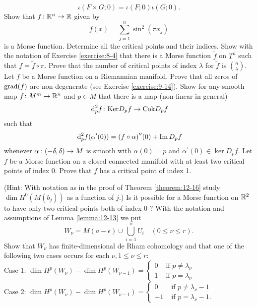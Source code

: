 \begin{enumerate}[\theexercise.1]
    \[
      \iota ( {F \times  G;0})  = \iota ( {F;0}) \iota ( {G;0}).
    \]
  \newchap[12]
  \NewItem Show that $f\colon {\ensuremath{\mathbb{R}}}^{n} \rightarrow  \mathbb{R}$ given by
    \[
      f( x)  = \sum_{{j = 1}}^{n}{\sin }^{2}( {\pi {x}_{j}})
    \]
    is a Morse function. Determine all the critical points and their indices. Show with the notation of Exercise \ref{exercise:8-4} that there is a Morse function $\tilde{f}$ on ${T}^{n}$ such that $f = \tilde{f} \circ  \pi$. Prove that the number of critical points of index $\lambda$ for $\tilde{f}$ is $\binom{n}{\lambda}$.
  \NewItem Let $f$ be a Morse function on a Riemannian manifold. Prove that all zeros of $\mathrm{grad}( f)$ are non-degenerate (see Exercise \ref{exercise:9-14}).
  \NewItem Show for any smooth map $f\colon {M}^{m} \rightarrow  {\ensuremath{\mathbb{R}}}^{n}$ and $p \in  M$ that there is a map (non-linear in general)
    \[
      {\dd}_{p}^{2}f\colon {\ker}{D}_{p}f \ra  {\cok}{D}_{p}f
    \]
    such that
    \[
      {\dd}_{p}^{2}f( {{\alpha }^{\prime }( 0) })  = {( f \circ  \alpha ) }^{\prime \prime }( 0)  + \im{D}_{p}f
    \]
    whenever $\alpha  : ( {-\delta,\delta })  \rightarrow  M$ is smooth with $\alpha ( 0)  = p$ and ${\alpha }^{\prime }( 0)  \in  {\ker}{D}_{p}f$.
  \NewItem Let $f$ be a Morse function on a closed connected manifold with at least two critical points of index 0. Prove that $f$ has a critical point of index 1.
    \par(Hint: With notation as in the proof of Theorem \ref{theorem:12-16} study $\dim {H}^{0}( {M( {b}_{j}) })$ as a function of $j$.)
  \NewItem Is it possible for a Morse function on ${\mathbb{R}}^{2}$ to have only two critical points both of index 0 ?
    \NewItem With the notation and assumptions of Lemma \ref{lemma:12-13} we put
    \[
      {W}_{\nu } = M( {a- \epsilon }) \cup \bigcup_{i=1}^{\nu }{U}_{i}\quad 
      ( {0 \leq  \nu  \leq  r}).
    \]
    Show that ${W}_{\nu }$ has finite-dimensional de Rham cohomology and that one of the following two cases occurs for each $\nu,1 \leq  \nu  \leq  r$:\\
    Case 1: $\dim {H}^{p}( {W}_{\nu }) - \dim {H}^{p}( {W}_{\nu - 1})  = \begin{cases} 0 & \text{ if }p \neq  {\lambda }_{\nu } \\  1 & \text{ if }p = {\lambda }_{\nu } \end{cases}$\\
    Case 2: $\dim {H}^{p}( {W}_{\nu }) - \dim {H}^{p}( {W}_{\nu - 1})  = \begin{cases} 0 & \text{ if }p \neq  {\lambda }_{\nu }- 1 \\  - 1 & \text{ if }p = {\lambda }_{\nu }- 1. \end{cases}$

\end{enumerate}

